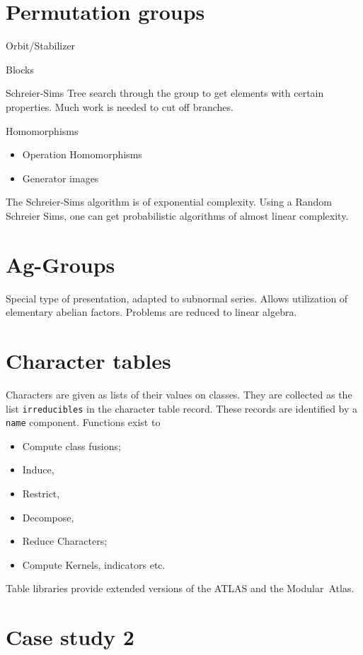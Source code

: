 \documentclass{article}
\newcommand{\entrylabel}[1]{\mbox{#1}\hfil}
\def\Abschnitt#1{\section*{{\huge\bf #1}}}
\newenvironment{entry}
{\begin{list}{}%
{\renewcommand{\makelabel}{\entrylabel}%
\setlength{\labelwidth}{45mm}%
\setlength{\leftmargin}{50mm}%
}%
}%
{\end{list}}
\begin{document}
\Abschnitt{Permutation groups}

\noindent
\begin{entry}
\item[Orbit/Stabilizer]
\item[Blocks]
\item[Schreier-Sims]
Tree search through the group to get elements with certain properties. Much
work is needed to cut off branches.
\item[Homomorphisms]
\begin{itemize}
\item Operation Homomorphisms
\item Generator images
\end{itemize}
\end{entry}
The Schreier-Sims algorithm is of exponential complexity. Using a Random
Schreier Sims, one can get probabilistic algorithms of almost linear
complexity.

\Abschnitt{Ag-Groups}

\noindent
Special type of presentation, adapted to subnormal series. Allows utilization
of elementary abelian factors. Problems are reduced to linear algebra. 

\Abschnitt{Character tables}
Characters are given as lists of their values on classes. They are collected
as the list {\tt irreducibles} in the character table record. These
records are identified by a {\tt name} component. Functions exist to
\begin{itemize}
\item Compute class fusions;
\item Induce,
\item Restrict,
\item Decompose,
\item Reduce Characters;
\item Compute Kernels, indicators etc.
\end{itemize}
Table libraries provide extended versions of the {\sf ATLAS} and the
\hbox{Modular Atlas}.

\Abschnitt{Case study 2}
\end{document}
